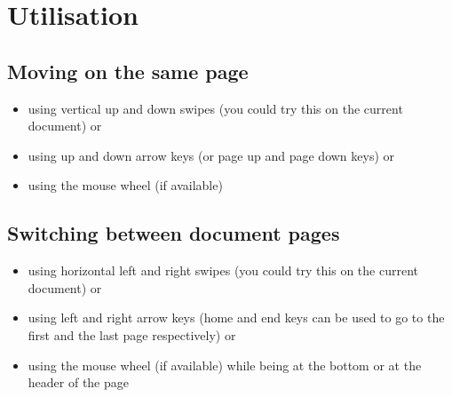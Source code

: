 \documentclass[journal,12pt]{IEEEtran}
\begin{document}
\newpage

\section{Utilisation}

\subsection{Moving on the same page}
\begin{itemize}
 \item using vertical up and down swipes (you could try this on the current document) or
 \item using up and down arrow keys (or page up and page down keys) or
 \item using the mouse wheel (if available)
\end{itemize}

\subsection{Switching between document pages}
\begin{itemize}
 \item using horizontal left and right swipes (you could try this on the current document) or
 \item using left and right arrow keys (home and end keys can be used to go to the first and the last page respectively) or
 \item using the mouse wheel (if available) while being at the bottom or at the header of the page
\end{itemize}
\end{document}
